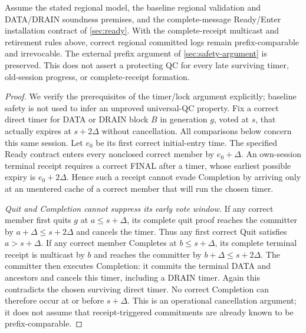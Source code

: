\begin{proposition}
\label{prop:retirement-safety}
Assume the stated regional model, the baseline regional validation
and DATA/DRAIN soundness premises, and the complete-message Ready/Enter
installation contract of \cref{sec:ready}. With the complete-receipt
multicast and retirement rules above, correct regional committed logs
remain prefix-comparable and irrevocable. The external prefix argument
of \cref{sec:safety-argument} is preserved. This does not assert a
protecting QC for every late surviving timer, old-session progress,
or complete-receipt formation.
\end{proposition}
\begin{proof}
We verify the prerequisites of the timer/lock argument explicitly;
baseline safety is not used to infer an unproved universal-QC property.
Fix a correct direct timer for DATA or DRAIN block $B$ in generation
$g$, voted at $s$, that actually expires at $s+2\Delta$ without
cancellation. All comparisons below concern this same session.
Let $e_0$ be its first correct initial-entry time. The specified Ready
contract enters every nonclosed correct member by $e_0+\Delta$.
An own-session terminal receipt requires a correct FINAL after a timer,
whose earliest possible expiry is $e_0+2\Delta$. Hence such a receipt
cannot evade Completion by arriving only at an unentered cache of a
correct member that will run the chosen timer.

\emph{Quit and Completion cannot suppress its early vote window.}
If any correct member first quits $g$ at $a\le s+\Delta$, its complete
quit proof reaches the committer by $a+\Delta\le s+2\Delta$ and
cancels the timer. Thus any first correct Quit satisfies
$a>s+\Delta$. If any correct member Completes at $b\le s+\Delta$,
its complete terminal receipt is multicast by $b$ and reaches the
committer by $b+\Delta\le s+2\Delta$. The committer then executes
Completion: it commits the terminal DATA and ancestors and cancels
this timer, including a DRAIN timer. Again this contradicts the chosen
surviving direct timer. No correct Completion can therefore occur at
or before $s+\Delta$. This is an operational cancellation argument;
it does not assume that receipt-triggered commitments are already
known to be prefix-comparable.


\end{proof}
